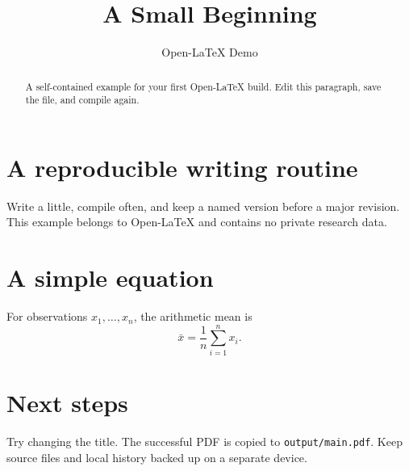 \documentclass[11pt]{article}
\title{A Small Beginning}
\author{Open-LaTeX Demo}
\date{}
\begin{document}
\maketitle
\begin{abstract}
A self-contained example for your first Open-LaTeX build.
Edit this paragraph, save the file, and compile again.
\end{abstract}
\section{A reproducible writing routine}
Write a little, compile often, and keep a named version before a major revision.
This example belongs to Open-LaTeX and contains no private research data.
\section{A simple equation}
For observations $x_1,\ldots,x_n$, the arithmetic mean is
\begin{equation}
  \bar{x} = \frac{1}{n}\sum_{i=1}^{n}x_i.
\end{equation}
\section{Next steps}
Try changing the title. The successful PDF is copied to \texttt{output/main.pdf}.
Keep source files and local history backed up on a separate device.
\end{document}
